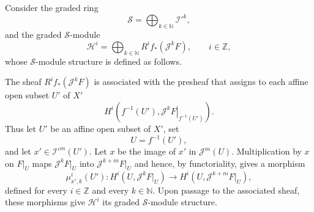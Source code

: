 \documentclass[11pt,a4paper,oneside]{book}
\theoremstyle{plain}
\theoremstyle{definition}
\theoremstyle{remark}
\begin{document}
Consider the graded ring
\begin{equation}
\tag{1.8}\label{eq:IX.1.8}
\mathcal S=\bigoplus_{k\in\mathbb N}{\mathcal I'}^k,
\end{equation}
and the graded $\mathcal S$-module
\begin{equation}
\tag{1.9}\label{eq:IX.1.9}
\mathcal H^i=\bigoplus_{k\in\mathbb N}R^i f_*(\mathcal J^kF),
\qquad i\in\mathbb Z,
\end{equation}
whose $\mathcal S$-module structure is defined as follows.

The sheaf $R^i f_*(\mathcal J^kF)$ is associated with the presheaf that
assigns to each affine open subset $U'$ of $X'$
\begin{equation}
\tag{1.10}\label{eq:IX.1.10}
H^i\!\left(f^{-1}(U'),
  \left.\mathcal J^kF\right|_{f^{-1}(U')}\right).
\end{equation}
Thus let $U'$ be an affine open subset of $X'$, set
\[
U=f^{-1}(U'),
\]
and let $x'\in{\mathcal I'}^m(U')$. Let $x$ be the image of $x'$ in
$\mathcal J^m(U)$. Multiplication by $x$ on $F|_U$ maps
$\mathcal J^kF|_U$ into $\mathcal J^{k+m}F|_U$ and hence, by
functoriality, gives a morphism
\begin{equation}
\tag{1.11}\label{eq:IX.1.11}
\mu^i_{x',k}(U'):
H^i(U,\mathcal J^kF|_U)
\longrightarrow
H^i(U,\mathcal J^{k+m}F|_U),
\end{equation}
defined for every $i\in\mathbb Z$ and every $k\in\mathbb N$. Upon passage
to the associated sheaf, these morphisms give $\mathcal H^i$ its graded
$\mathcal S$-module structure.
\end{document}
